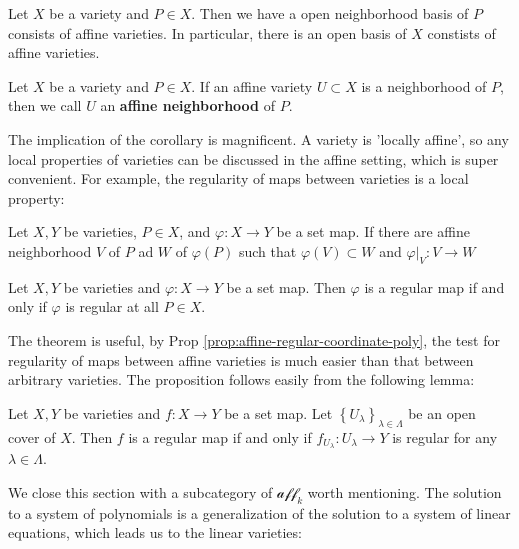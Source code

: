 \documentclass{note-eng}
\begin{document}
\begin{corollary}
    Let $X$ be a variety and $P \in X$. Then we have a open neighborhood basis of $P$ consists of affine varieties. In particular, there is an open basis of $X$ constists of affine varieties.
\end{corollary}

\begin{definition}
    Let $X$ be a variety and $P \in X$. If an affine variety $U \subset X$ is a neighborhood of $P$, then we call $U$ an \textbf{affine neighborhood} of $P$.
\end{definition}

The implication of the corollary is magnificent. A variety is 'locally affine', so any local properties of varieties can be discussed in the affine setting, which is super convenient. For example, the regularity of maps between varieties is a local property:

\begin{definition}
    Let $X, Y$ be varieties, $P \in X$, and $\varphi: X \rightarrow Y$ be a set map. If there are affine neighborhood $V$ of $P$ ad $W$ of $\varphi(P)$ such that $\varphi(V) \subset W$ and $\varphi|_V: V \rightarrow W$
\end{definition}

\begin{proposition}
    Let $X, Y$ be varieties and $\varphi: X \rightarrow Y$ be a set map. Then $\varphi$ is a regular map if and only if $\varphi$ is regular at all $P \in X$.
\end{proposition}

The theorem is useful, by Prop \ref{prop:affine-regular-coordinate-poly}, the test for regularity of maps between affine varieties is much easier than that between arbitrary varieties. The proposition follows easily from the following lemma:

\begin{lemma}
    Let $X, Y$ be varieties and $f: X \rightarrow Y$ be a set map. Let $\left\lbrace U_{\lambda} \right\rbrace_{\lambda \in \Lambda}$ be an open cover of $X$. Then $f$ is a regular map if and only if $f_{U_\lambda}: U_\lambda \rightarrow Y$ is regular for any $\lambda \in \Lambda$.
\end{lemma}

\iffalse

We close this section with a subcategory of $\mathscr{aff}_k$ worth mentioning. The solution to a system of polynomials is a generalization of the solution to a system of linear equations, which leads us to the linear varieties:
\end{document}
